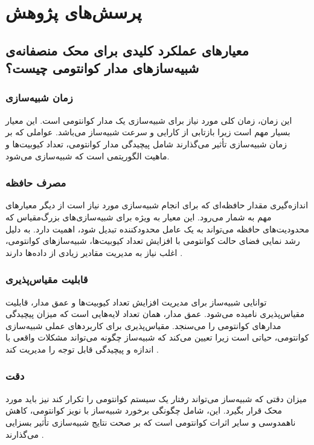 \section{پرسش‌های پژوهش}
\subsection*{معیارهای عملکرد کلیدی برای محک منصفانه‌ی شبیه‌سازهای مدار کوانتومی چیست؟}
\subsubsection{زمان شبیه‌سازی}
این زمان، زمان کلی مورد نیاز برای شبیه‌سازی یک مدار کوانتومی است. این معیار بسیار مهم است زیرا بازتابی از کارایی و سرعت شبیه‌ساز می‌باشد. عواملی که بر زمان شبیه‌سازی تأثیر می‌گذارند شامل پیچیدگی مدار کوانتومی، تعداد کیوبیت‌ها و ماهیت الگوریتمی است که شبیه‌سازی می‌شود\cite{lubinski_application-oriented_2023, jamadagni_benchmarking_2024}.

\subsubsection{مصرف حافظه}
اندازه‌گیری مقدار حافظه‌ای که برای انجام شبیه‌سازی مورد نیاز است از دیگر معیارهای مهم به شمار می‌رود. این معیار به ویژه برای شبیه‌سازی‌های بزرگ‌مقیاس که محدودیت‌های حافظه می‌تواند به یک عامل محدودکننده تبدیل شود، اهمیت دارد. به دلیل رشد نمایی فضای حالت کوانتومی با افزایش تعداد کیوبیت‌ها، شبیه‌سازهای کوانتومی، اغلب نیاز به مدیریت مقادیر زیادی از داده‌ها دارند \cite{lubinski_application-oriented_2023}.

\subsubsection{قابلیت مقیاس‌پذیری}
توانایی شبیه‌ساز برای مدیریت افزایش تعداد کیوبیت‌ها و عمق مدار، قابلیت مقیاس‌پذیری نامیده می‌شود. عمق مدار، همان تعداد لایه‌هایی است که میزان پیچیدگی مدارهای کوانتومی را می‌سنجد. مقیاس‌پذیری برای کاربردهای عملی شبیه‌سازی کوانتومی، حیاتی است زیرا تعیین می‌کند که شبیه‌ساز چگونه می‌تواند مشکلات واقعی با اندازه و پیچیدگی قابل توجه را مدیریت کند \cite{jamadagni_benchmarking_2024, lubinski_application-oriented_2023}.
\subsubsection{دقت}
میزان دقتی که شبیه‌ساز می‌تواند رفتار یک سیستم کوانتومی را تکرار کند نیز باید مورد محک قرار بگیرد. این، شامل چگونگی برخورد شبیه‌ساز با نویز کوانتومی، کاهش ناهمدوسی و سایر اثرات کوانتومی است که بر صحت نتایج شبیه‌سازی تأثیر بسزایی می‌گذارند \cite{jamadagni_benchmarking_2024, lubinski_application-oriented_2023}.
